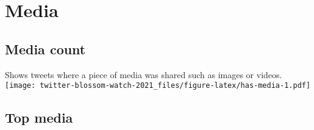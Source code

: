 \documentclass[
]{article}
\begin{document}
\hypertarget{media}{%
\section{Media}\label{media}}

\hypertarget{media-count}{%
\subsection{Media count}\label{media-count}}

Shows tweets where a piece of media was shared such as images or videos.
\texttt{[image: twitter-blossom-watch-2021\_files/figure-latex/has-media-1.pdf]}

\hypertarget{top-media}{%
\subsection{Top media}\label{top-media}}
\end{document}
